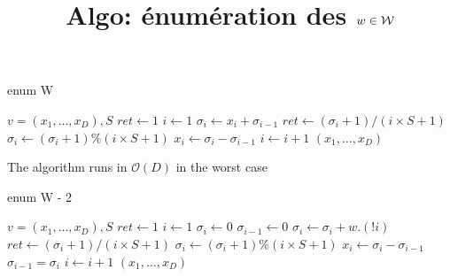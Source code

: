 \documentclass[10pt,a4paper]{article}
\title{Algo: énumération des $w\in\mathcal{W}$}
\begin{document}
\maketitle

\begin{algorithm}
  \caption{enum W}
  \begin{algorithmic}
    \REQUIRE $v=(x_1,\dots, x_D), S$
    \STATE $ret\leftarrow1$
    \STATE $i\leftarrow1$    
    \STATE $\sigma_i\leftarrow x_i+\sigma_{i-1}$
    \ENDFOR
    \STATE $ret\leftarrow(\sigma_i+1)/(i\times S+1)$
    \STATE $\sigma_i\leftarrow(\sigma_i+1)\%(i\times S+1)$
    \STATE $x_i\leftarrow \sigma_i-\sigma_{i-1}$
    \STATE $i\leftarrow i+1$
    \ENDWHILE
    \RETURN $(x_1,\dots,x_D)$
  \end{algorithmic}
\end{algorithm}

The algorithm runs in $\mathcal{O}(D)$ in the worst case

\begin{algorithm}
  \caption{enum W - 2}
  \begin{algorithmic}
    \REQUIRE $v=(x_1,\dots, x_D), S$
    \STATE $ret\leftarrow1$
    \STATE $i\leftarrow1$
    \STATE $\sigma_i\leftarrow0$
    \STATE $\sigma_{i-1}\leftarrow0$    
    \STATE $\sigma_i\leftarrow\sigma_i+w.(!i)$
    \STATE $ret\leftarrow(\sigma_i+1)/(i\times S+1)$
    \STATE $\sigma_i\leftarrow(\sigma_i+1)\%(i\times S+1)$
    \STATE $x_i\leftarrow \sigma_i-\sigma_{i-1}$
    \STATE $\sigma_{i-1} = \sigma_i$
    \STATE $i\leftarrow i+1$
    \ENDWHILE
    \RETURN $(x_1,\dots,x_D)$
  \end{algorithmic}
\end{algorithm}
\end{document}
